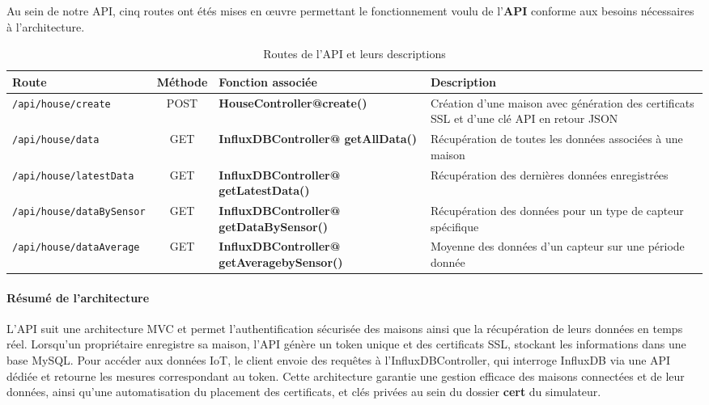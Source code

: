 \documentclass[10pt, a4paper]{report}
\begin{document}
	Au sein de notre API, cinq routes ont étés mises en œuvre permettant le fonctionnement voulu de l'\textbf{API} conforme aux besoins nécessaires à l'architecture.
	
	

\begin{table}[h]
	\centering
	\small %
	\renewcommand{\arraystretch}{1.2} %
	\begin{tabularx}{\textwidth}{|X|c|X|X|}
		\hline
		\textbf{Route} & \textbf{Méthode} & \textbf{Fonction associée} & \textbf{Description} \\
		\hline
		\texttt{/api/house/create} & POST & \textbf{HouseController@create()} & Création d’une maison avec génération des certificats SSL et d’une clé API en retour JSON \\
		\hline
		\texttt{/api/house/data} & GET & \textbf{InfluxDBController@
		getAllData()} & Récupération de toutes les données associées à une maison \\
		\hline
		\texttt{/api/house/latestData} & GET & \textbf{InfluxDBController@
			getLatestData()} & Récupération des dernières données enregistrées \\
		\hline
		\texttt{/api/house/dataBySensor} & GET & \textbf{InfluxDBController@
			getDataBySensor()} & Récupération des données pour un type de capteur spécifique \\
		\hline
		\texttt{/api/house/dataAverage} & GET & \textbf{InfluxDBController@
			getAveragebySensor()} & Moyenne des données d’un capteur sur une période donnée \\
		\hline
	\end{tabularx}
	\caption{Routes de l'API et leurs descriptions}
	\label{tab:api_routes}
\end{table}

\newpage
	
	\paragraph{Résumé de l'architecture\\}
	L'API suit une architecture MVC et permet l’authentification sécurisée des maisons ainsi que la récupération de leurs données en temps réel. Lorsqu’un propriétaire enregistre sa maison, l’API génère un token unique et des certificats SSL, stockant les informations dans une base MySQL. Pour accéder aux données IoT, le client envoie des requêtes à l’InfluxDBController, qui interroge InfluxDB via une API dédiée et retourne les mesures correspondant au token. Cette architecture garantie une gestion efficace des maisons connectées et de leur données, ainsi qu'une automatisation du placement des certificats, et clés privées au sein du dossier \textbf{cert} du simulateur.\\
	
\end{document}
